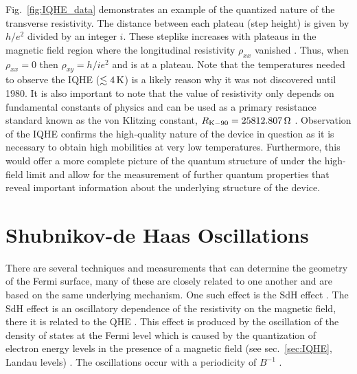 Fig.~\ref{fig:IQHE_data} demonstrates an example of the quantized nature of the transverse resistivity. The distance between each plateau (step height) is given by $h/e^2$ divided by an integer $i$. These steplike increases with plateaus in the magnetic field region where the longitudinal resistivity $\rho_{xx}$ vanished \cite{Klitzing_RevModPhys1986}. Thus, when $\rho_{xx} = 0$ then $\rho_{xy} = h/i e^2$ and is at a plateau. Note that the temperatures needed to observe the \acs{IQHE} ($\lesssim 4\,\mathrm{K}$) is a likely reason why it was not discovered until 1980. It is also important to note that the value of resistivity only depends on fundamental constants of physics and can be used as a primary resistance standard known as the von Klitzing constant, $R_{\mathrm{K}-90} = 25812.807\,\mathrm{\Omega}$ \cite{Klitzing_PhysRevLett1980,Aoki_PhysRevLett1986,Bliek_Met1988}. Observation of the \acs{IQHE} confirms the high-quality nature of the device in question as it is necessary to obtain high mobilities at very low temperatures. Furthermore, this would offer a more complete picture of the quantum structure of under the high-field limit and allow for the measurement of further quantum properties that reveal important information about the underlying structure of the device.%

\section{Shubnikov-de Haas Oscillations}\label{sec:qm_oscillations}
There are several techniques and measurements that can determine the geometry of the Fermi surface, many of these are closely related to one another and are based on the same underlying mechanism. One such effect is the \acs{SdH} effect \cite{Shubnikov_Leiden1930}. The \acs{SdH} effect is an oscillatory dependence of the resistivity on the magnetic field, there it is related to the \ac{QHE} \cite{Soule_PhysRev1964}. This effect is produced by the oscillation of the density of states at the Fermi level which is caused by the quantization of electron energy levels in the presence of a magnetic field (see sec.~\ref{sec:IQHE}, Landau levels) \cite{Peierls_ZPhys1933,Landau_RoyalSoc1939}. The oscillations occur with a periodicity of $B^{-1}$ \cite{Shoenberg_Magnet1984}.\\ \\

